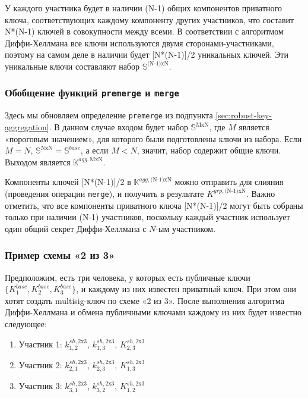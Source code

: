 У каждого участника будет в наличии (N-1) общих компонентов приватного ключа, соответ\-ствующих каждому компоненту других участников, что составит N*(N-1) ключей в совокуп\-ности между всеми. В соответствии с алгоритмом Диффи-Хеллмана все ключи используются двумя сторонами-участниками, поэтому на самом деле в наличии будет [N*(N-1)]/2 уникаль\-ных ключей. Эти уникальные ключи составляют набор $\mathbb{S}^{\textrm{(N-1)xN}}$.

\subsubsection*{Обобщение функций {\tt premerge} и {\tt merge}}

Здесь мы обновляем определение {\tt premerge} из подпункта \ref{sec:robust-key-aggregation}. В данном случае входом будет набор $\mathbb{S}^{\textrm{MxN}}$, где $M$ является «пороговым значением», для которого были подготовлены ключи из набора. Если $M = N$, $\mathbb{S}^{\textrm{NxN}} = \mathbb{S}^{base}$, а если $M < N$, значит, набор содержит общие ключи. Выходом является $\mathbb{K}^{agg,\textrm{MxN}}$.

Компоненты ключей [N*(N-1)]/2 в $\mathbb{K}^{agg,\textrm{(N-1)xN}}$ можно отправить для слияния (проведения операции {\tt merge}), и получить в результате $K^{grp,\textrm{(N-1)xN}}$. Важно отметить, что все компоненты приватного ключа [N*(N-1)]/2 могут быть собраны только при наличии (N-1) участников, поскольку каждый участник использует один общий секрет Диффи-Хеллмана с $N$-ым участ\-ником.

\subsubsection*{Пример схемы «2 из 3»}

Предположим, есть три человека, у которых есть публичные ключи $\{K^{base}_1,K^{base}_2,K^{base}_3\}$, и каждому из них известен приватный ключ. При этом они хотят создать multisig-ключ по схеме «2 из 3». После выполнения алгоритма Диффи-Хеллмана и обмена публичными ключами каждому из них будет известно следующее:
\begin{enumerate}
    \item Участник 1: $k^{sh,\textrm{2x3}}_{1,2}$, $k^{sh,\textrm{2x3}}_{1,3}$, $K^{sh,\textrm{2x3}}_{2,3}$
    \item Участник 2: $k^{sh,\textrm{2x3}}_{2,1}$, $k^{sh,\textrm{2x3}}_{2,3}$, $K^{sh,\textrm{2x3}}_{1,3}$
    \item Участник 3: $k^{sh,\textrm{2x3}}_{3,1}$, $k^{sh,\textrm{2x3}}_{3,2}$, $K^{sh,\textrm{2x3}}_{1,2}$
\end{enumerate}

